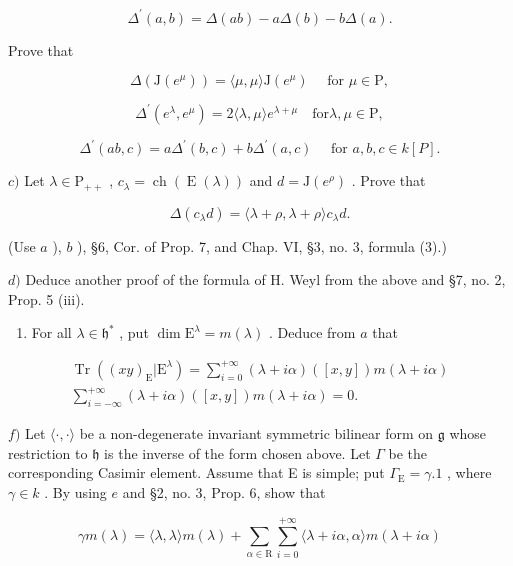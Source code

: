 \[
\Delta^ {\prime} (a, b) = \Delta (a b) - a \Delta (b) - b \Delta (a).
\]

Prove that

\[
\Delta (\mathrm{J} (e ^ {\mu})) = \langle \mu , \mu \rangle \mathrm{J} (e ^ {\mu}) \quad \text { for } \mu \in \mathrm{P},
\]

\[
\Delta^ {\prime} (e ^ {\lambda}, e ^ {\mu}) = 2 \langle \lambda , \mu \rangle e ^ {\lambda + \mu} \quad \mathrm{for} \lambda , \mu \in \mathrm{P},
\]

\[
\Delta^ {\prime} (a b, c) = a \Delta^ {\prime} (b, c) + b \Delta^ {\prime} (a, c) \quad \text { for } a, b, c \in k [ P ].
\]

\(c)\) Let \(\lambda \in \mathrm{P}_{++}\) , \(c_{\lambda} = \operatorname{ch}(\operatorname{E}(\lambda))\) and \(d = \mathrm{J}(e^{\rho})\) . Prove that

\[
\Delta (c _ {\lambda} d) = \langle \lambda + \rho , \lambda + \rho \rangle c _ {\lambda} d.
\]

(Use \(a\) ), \(b\) ), §6, Cor. of Prop. 7, and Chap. VI, §3, no. 3, formula (3).)

\(d)\) Deduce another proof of the formula of H. Weyl from the above and §7, no. 2, Prop. 5 (iii).

\begin{enumerate}
\def\labelenumi{\alph{enumi})}
\setcounter{enumi}{4}
\tightlist
\item
  For all \(\lambda \in \mathfrak{h}^*\) , put \(\dim \mathrm{E}^{\lambda} = m(\lambda)\) . Deduce from \(a\) that
\end{enumerate}

\[
\begin{array}{c} \operatorname{Tr} ((x y) _ {\mathrm{E}} | \mathrm{E} ^ {\lambda}) = \sum_ {i = 0} ^ {+ \infty} (\lambda + i \alpha) ([ x, y ]) m (\lambda + i \alpha) \\ \sum_ {i = - \infty} ^ {+ \infty} (\lambda + i \alpha) ([ x, y ]) m (\lambda + i \alpha) = 0. \end{array}
\]

\(f)\) Let \(\langle\cdot,\cdot\rangle\) be a non-degenerate invariant symmetric bilinear form on \(\mathfrak{g}\) whose restriction to \(\mathfrak{h}\) is the inverse of the form chosen above. Let \(\Gamma\) be the corresponding Casimir element. Assume that E is simple; put \(\Gamma_{\mathrm{E}}=\gamma.1\) , where \(\gamma\in k\) . By using \(e\) and §2, no. 3, Prop. 6, show that

\[
\gamma m (\lambda) = \langle \lambda , \lambda \rangle m (\lambda) + \sum_ {\alpha \in \mathrm{R}} \sum_ {i = 0} ^ {+ \infty} \langle \lambda + i \alpha , \alpha \rangle m (\lambda + i \alpha)
\]

